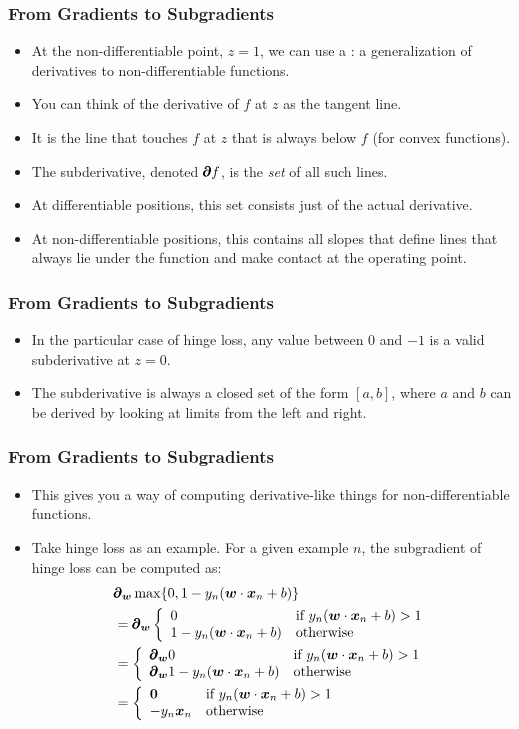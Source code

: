 \documentclass[trans]{beamer}
\begin{document}
\begin{frame}
  \frametitle{From Gradients to Subgradients}
\begin{itemize}
\item 
  At the non-differentiable point, $z=1$, we
can use a : a generalization of derivatives to
non-differentiable functions.
\item You can think of the
derivative of $f$ at $z$ as the tangent line.
\item It is the line
that touches $f$ at $z$ that is always below $f$ (for convex
functions). 
\item The subderivative, denoted $\pmb\partial f$, is the
\emph{set} of all such lines.
\item  At differentiable positions, this set
consists just of the actual derivative.
\item  At non-differentiable
positions, this contains all slopes that define lines that always lie
under the function and make contact at the operating point. 
\end{itemize}
\end{frame}

\begin{frame}
  \frametitle{From Gradients to Subgradients}
\begin{itemize}
\item 
In the
particular case of hinge loss, any value between $0$ and $-1$ is a
valid subderivative at $z=0$.
\item The subderivative is always a
closed set of the form $[a,b]$, where $a$ and $b$ can be derived by
looking at limits from the left and right.
\end{itemize}
\end{frame}

\begin{frame}
  \frametitle{From Gradients to Subgradients}
\begin{itemize}
\item 
This gives you a way of computing derivative-like things for
non-differentiable functions. 
\item Take hinge loss as an example.  For a
given example $n$, the subgradient of hinge loss can be computed as:
%
\begin{align}
&\pmb\partial_{\boldsymbol{w}} \max \{ 0, 1 - y_n ( {\boldsymbol{w}} \cdot {\boldsymbol{x}}_n+b ) \} \\
&= \pmb\partial_{\boldsymbol{w}} \left\{\begin{array}{ll} 0 & \text{if } y_n ( {\boldsymbol{w}} \cdot {\boldsymbol{x}}_n+b ) > 1 \\
                        1 - y_n ( {\boldsymbol{w}} \cdot {\boldsymbol{x}}_n+b )  & \text{otherwise}\end{array}\right.\\
&= \left\{\begin{array}{ll} \pmb\partial_{\boldsymbol{w}} 0 & \text{if } y_n ( {\boldsymbol{w}} \cdot {\boldsymbol{x}}_n+b ) > 1 \\
           \pmb\partial_{\boldsymbol{w}} 1 - y_n ( {\boldsymbol{w}} \cdot {\boldsymbol{x}}_n+b )  & \text{otherwise}\end{array}\right.\\
&= \left\{\begin{array}{ll} \boldsymbol{0} & \text{if } y_n ( {\boldsymbol{w}} \cdot {\boldsymbol{x}}_n+b ) > 1 \\
           - y_n {\boldsymbol{x}}_n  & \text{otherwise}\end{array}\right.
\end{align}
\end{itemize}
\end{frame}
\end{document}
